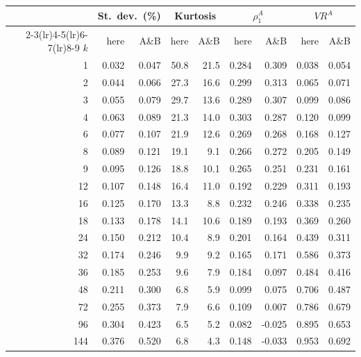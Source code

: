 \begin{tabular}{rrrrrrrrr}
\toprule
 & \multicolumn{2}{c}{St.\ dev.\ (\%)} & \multicolumn{2}{c}{Kurtosis} & \multicolumn{2}{c}{$\rho_1^A$} & \multicolumn{2}{c}{$VR^A$} \\
\cmidrule(lr){2-3}\cmidrule(lr){4-5}\cmidrule(lr){6-7}\cmidrule(lr){8-9}
$k$ & here & A\&B & here & A\&B & here & A\&B & here & A\&B \\
\midrule
1 & 0.032 & 0.047 & 50.8 & 21.5 & 0.284 & 0.309 & 0.038 & 0.054 \\
2 & 0.044 & 0.066 & 27.3 & 16.6 & 0.299 & 0.313 & 0.065 & 0.071 \\
3 & 0.055 & 0.079 & 29.7 & 13.6 & 0.289 & 0.307 & 0.099 & 0.086 \\
4 & 0.063 & 0.089 & 21.3 & 14.0 & 0.303 & 0.287 & 0.120 & 0.099 \\
6 & 0.077 & 0.107 & 21.9 & 12.6 & 0.269 & 0.268 & 0.168 & 0.127 \\
8 & 0.089 & 0.121 & 19.1 & 9.1 & 0.266 & 0.272 & 0.205 & 0.149 \\
9 & 0.095 & 0.126 & 18.8 & 10.1 & 0.265 & 0.251 & 0.231 & 0.161 \\
12 & 0.107 & 0.148 & 16.4 & 11.0 & 0.192 & 0.229 & 0.311 & 0.193 \\
16 & 0.125 & 0.170 & 13.3 & 8.8 & 0.232 & 0.246 & 0.338 & 0.235 \\
18 & 0.133 & 0.178 & 14.1 & 10.6 & 0.189 & 0.193 & 0.369 & 0.260 \\
24 & 0.150 & 0.212 & 10.4 & 8.9 & 0.201 & 0.164 & 0.439 & 0.311 \\
32 & 0.174 & 0.246 & 9.9 & 9.2 & 0.165 & 0.171 & 0.586 & 0.373 \\
36 & 0.185 & 0.253 & 9.6 & 7.9 & 0.184 & 0.097 & 0.484 & 0.416 \\
48 & 0.211 & 0.300 & 6.8 & 5.9 & 0.099 & 0.075 & 0.706 & 0.487 \\
72 & 0.255 & 0.373 & 7.9 & 6.6 & 0.109 & 0.007 & 0.786 & 0.679 \\
96 & 0.304 & 0.423 & 6.5 & 5.2 & 0.082 & -0.025 & 0.895 & 0.653 \\
144 & 0.376 & 0.520 & 6.8 & 4.3 & 0.148 & -0.033 & 0.953 & 0.692 \\
\bottomrule
\end{tabular}